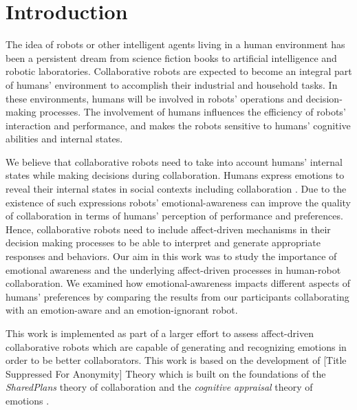 \documentclass{sig-alternate-05-2015}
\begin{document}
%
%

%
%
\printccsdesc



\vspace*{-3mm}
\section{Introduction}
The idea of robots or other intelligent agents living in a human environment has
been a persistent dream from science fiction books to artificial intelligence
and robotic laboratories. Collaborative robots are expected to become an
integral part of humans' environment to accomplish their industrial and
household tasks. In these environments, humans will be involved in robots'
operations and decision-making processes. The involvement of humans influences
the efficiency of robots' interaction and performance, and makes the robots
sensitive to humans' cognitive abilities and internal states.

We believe that collaborative robots need to take into account humans' internal
states while making decisions during collaboration. Humans express emotions to
reveal their internal states in social contexts including collaboration
\cite{breazeal:sociable-interactive-robots}. Due to the existence of such
expressions robots' emotional-awareness can improve the quality of collaboration
in terms of humans' perception of performance and preferences. Hence,
collaborative robots need to include affect-driven mechanisms in their
decision making processes to be able to interpret and generate appropriate
responses and behaviors. Our aim in this work was to study the importance of
emotional awareness and the underlying affect-driven processes in human-robot
collaboration. We examined how emotional-awareness impacts different aspects of
humans' preferences by comparing the results from our participants collaborating
with an emotion-aware and an emotion-ignorant robot.

This work is implemented as part of a larger effort to assess affect-driven
collaborative robots which are capable of generating and recognizing emotions in
order to be better collaborators. This work is based on the development of
[Title Suppressed For Anonymity] Theory which is built on the foundations of
the \textit{SharedPlans} theory of collaboration \cite{grosz:plans-discourse}
and the \textit{cognitive appraisal} theory of emotions
\cite{gratch:domain-independent}.
\end{document}
